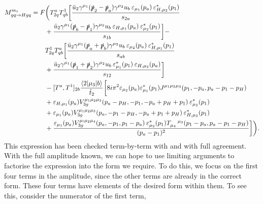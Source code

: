 \begin{equation}
\begin{split}
M_{gq \to Hgq}^{m_t} = F &\biggl( T^a_{2q}T^1_{qb} \biggl[ \frac{ \bar{u}_2 \gamma^{\mu_1} (\slashed{p}_2 - \slashed{p}_a ) \gamma^{\mu_2} u_b \hspace{2pt} \varepsilon_{\mu_1} (p_a) \hspace{2pt} \varepsilon_{H,\mu_2}^*(p_1)}{s_{2a}} \\
&+ \frac{\bar{u}_2 \gamma^{\mu_1} (\slashed{p}_b - \slashed{p}_1)\gamma^{\mu_2}u_b \hspace{2pt} \varepsilon_{H,\mu_1}(p_a) \hspace{2pt} \varepsilon^*_{\mu_2}(p_1)}{s_{1b}} \biggr] - \\
&T^1_{2q}T^a_{qb} \biggl[ \frac{\bar{u}_2 \gamma^{\mu_1}(\slashed{p}_a+\slashed{p}_b)\gamma^{\mu_2} u_b \hspace{2pt} \varepsilon_{\mu_2}(p_a) \hspace{2pt} \varepsilon^*_{H,\mu_1}(p_1)}{s_{ab}} \\
& + \frac{\bar{u}_2 \gamma^{\mu_1}(\slashed{p}_1+\slashed{p}_2)\gamma^{\mu_2}u_b \hspace{2pt} \varepsilon_{\mu_1}^*(p_1) \hspace{2pt} \varepsilon_{H,\mu_2}(p_a)}{s_{12}} \biggr]  \\
 &- [T^a, T^1]_{2b} \frac{\mathinner{\langle2\vert\mu_3\vert b\rangle}_{}}{\hat{t}_2} \biggl[ 8 i \pi^2 \varepsilon_{\mu_2}(p_a) \varepsilon^*_{\mu_1}(p_1)J^{\mu_1 \mu_2 \mu_3}(p_1,-p_a,p_a-p_1-p_H) \\
&+  \varepsilon_{H,\mu_1}(p_a)V_{3g}^{\mu_1 \mu_2 \mu_3}(p_a-p_H, -p_1, -p_a + p_H + p_1) \hspace{2pt} \varepsilon^*_{\mu_2}(p_1)  \\
&+  \varepsilon_{\mu_1}(p_a)V_{3g}^{\mu_1 \mu_2 \mu_3}(p_a,-p_1-p_H,-p_a+p_1+p_H) \hspace{2pt} \varepsilon_{H,\mu_2}^*(p_1)  \\
&+  \frac{\varepsilon_{\mu_1}(p_a)V_{3g}^{\mu_! \mu_2 \mu_4}(p_a,-p_1,p_1-p_a) \hspace{2pt} \varepsilon^*_{\mu_2}(p_1)T_{\mu_4}^{\hspace{10pt} \mu_3}(p_1-p_a,p_a-p_1-p_H)}{(p_a-p_1)^2} \biggr] \biggr).
\end{split}
\end{equation}
This expression has been checked term-by-term with \cite{DelDuca2001} and \cite{Duca2003} with full agreement. With the full amplitude known, we can hope to use limiting arguments to factorise the expression into the form we require. To do this, we focus on the first four terms in the amplitude, since the other terms are already in the correct form. These four terms have elements of the desired form within them. To see this, consider the numerator of the first term,
